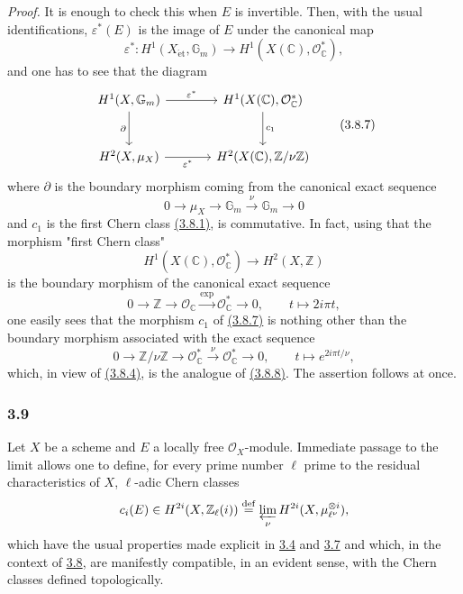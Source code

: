 \documentclass[11pt]{article}
\providecommand{\et}{\mathrm{\acute{e}t}}
\providecommand{\et}{\acute{e}t}
\begin{document}
\emph{Proof.} It is enough to check this when $E$ is invertible. Then, with the usual identifications, $\varepsilon^*(E)$ is the image of $E$ under the canonical map
\[
\varepsilon^*:H^1(X_{\et},\mathbb G_m)\to H^1(X(\mathbb C),\mathcal O_\mathbb C^*),
\tag{3.8.6}\label{sga5:VII:equation:3.8.6}
\]
and one has to see that the diagram
\[
\begin{tikzcd}[column sep=large,row sep=large]
H^1(X,\mathbb G_m) \arrow[r,"\varepsilon^*"] \arrow[d,"\partial"'] &
H^1(X(\mathbb C),\mathcal O_\mathbb C^*) \arrow[d,"c_1"]\\
H^2(X,\mu_X) \arrow[r,"\varepsilon^*"'] &
H^2(X(\mathbb C),\mathbb Z/\nu\mathbb Z)
\end{tikzcd}
\tag{3.8.7}\label{sga5:VII:equation:3.8.7}
\]
where $\partial$ is the boundary morphism coming from the canonical exact sequence
\[
0\to \mu_X\to\mathbb G_m\xrightarrow{\nu}\mathbb G_m\to0
\tag{3.8.8}\label{sga5:VII:equation:3.8.8}
\]
and $c_1$ is the first Chern class \hyperref[sga5:VII:equation:3.8.1]{(3.8.1)}, is commutative. In fact, using that the morphism "first Chern class"
\[
H^1(X(\mathbb C),\mathcal O_\mathbb C^*)\to H^2(X,\mathbb Z)
\]
is the boundary morphism of the canonical exact sequence
\[
0\to\mathbb Z\to\mathcal O_\mathbb C\xrightarrow{\exp}\mathcal O_\mathbb C^*\to0,
\qquad
t\mapsto 2i\pi t,
\]
one easily sees that the morphism $c_1$ of \hyperref[sga5:VII:equation:3.8.7]{(3.8.7)} is nothing other than the boundary morphism associated with the exact sequence
\[
0\to\mathbb Z/\nu\mathbb Z\to\mathcal O_\mathbb C^*\xrightarrow{\nu}\mathcal O_\mathbb C^*\to0,
\qquad
t\mapsto e^{2i\pi t/\nu},
\]
which, in view of \hyperref[sga5:VII:equation:3.8.4]{(3.8.4)}, is the analogue of \hyperref[sga5:VII:equation:3.8.8]{(3.8.8)}. The assertion follows at once.

\subsubsection*{3.9}\label{sga5:VII:subsubsection:3.9}
Let $X$ be a scheme and $E$ a locally free $\mathcal O_X$-module. Immediate passage to the limit allows one to define, for every prime number $\ell$ prime to the residual characteristics of $X$, $\ell$-adic Chern classes
\[
c_i(E)\in H^{2i}(X,\mathbb Z_\ell(i))
\stackrel{\mathrm{def}}{=}\varprojlim_\nu H^{2i}(X,\mu_{\ell^\nu}^{\otimes i}),
\]
which have the usual properties made explicit in \hyperref[sga5:VII:proposition:3.4]{3.4} and \hyperref[sga5:VII:corollary:3.7]{3.7} and which, in the context of \hyperref[sga5:VII:subsubsection:3.8]{3.8}, are manifestly compatible, in an evident sense, with the Chern classes defined topologically.
\end{document}
